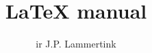 \newcommand*{\BOOKCLASS}{}


\title{LaTeX manual}
\author{ir J.P. Lammertink}
\maketitle
\tableofcontents



